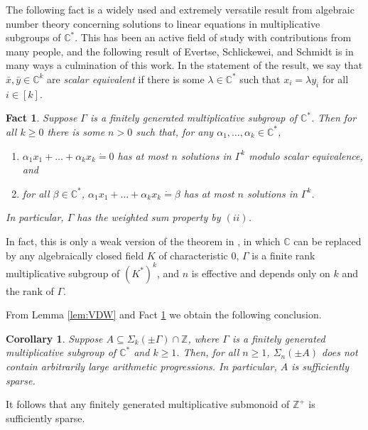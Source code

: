 \documentclass{amsart}
\def\seq{\subseteq}
\newcommand{\xbar}{\bar{x}}
\newcommand{\ybar}{\bar{y}}
\newcommand{\de}{\mathbin{\dot{=}}}
\def\C{\mathbb C}
\def\Z{\mathbb Z}
\newtheorem{corollary}[theorem]{Corollary}
\newtheorem{fact}[theorem]{Fact}
\theoremstyle{definition}
\begin{document}
The following fact is a widely used and extremely versatile result from algebraic number theory concerning solutions to linear equations in multiplicative subgroups of $\C^*$. This has been an active field of study with contributions from many people, and the following result of Evertse, Schlickewei, and Schmidt \cite{ESS} is in many ways a culmination of this work. In the statement of the result, we say that $\xbar,\ybar\in \C^k$ are \emph{scalar equivalent} if there is some $\lambda\in\C^*$ such that $x_i=\lambda y_i$ for all $i\in [k]$.

\begin{fact}\label{fact:ESS}
Suppose $\Gamma$ is a finitely generated multiplicative subgroup of $\C^*$. Then for all $k\geq 0$ there is some $n>0$ such that, for any $\alpha_1,\ldots,\alpha_k\in \C^*$, 
\begin{enumerate}[$(i)$]
\item $\alpha_1x_1+\ldots+\alpha_kx_k\de 0$ has at most $n$ solutions in $\Gamma^k$ modulo scalar equivalence, and
\item for all $\beta\in\C^*$,  $\alpha_1x_1+\ldots+\alpha_kx_k\de \beta$ has at most $n$ solutions in $\Gamma^k$.
\end{enumerate}
In particular, $\Gamma$ has the weighted sum property by $(ii)$. 
\end{fact}

In fact, this is only a weak version of the theorem in \cite{ESS}, in which $\C$ can be replaced by any algebraically closed field $K$ of characteristic $0$, $\Gamma$ is a finite rank multiplicative subgroup of $(K^*)^k$, and $n$ is effective and depends only on $k$ and the rank of $\Gamma$. 



From Lemma \ref{lem:VDW} and Fact \ref{fact:ESS} we obtain the following conclusion.


\begin{corollary}\label{cor:mgss}
Suppose $A\seq\Sigma_k(\pm \Gamma)\cap\Z$, where $\Gamma$ is a finitely generated multiplicative subgroup of $\C^*$ and $k\geq 1$. Then, for all $n\geq 1$, $\Sigma_n(\pm A)$ does not contain arbitrarily large arithmetic progressions. In particular, $A$ is sufficiently sparse.
\end{corollary}

It follows that any finitely generated multiplicative submonoid of $\Z^+$ is sufficiently sparse.
\end{document}
